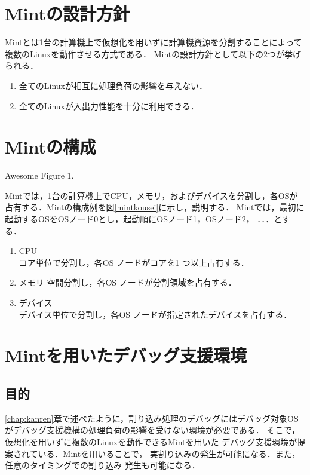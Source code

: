 \documentclass[tanilab-enum]{graduate}
\begin{document}
\section{Mintの設計方針}
Mintとは1台の計算機上で仮想化を用いずに計算機資源を分割することによって
複数のLinuxを動作させる方式である．
Mintの設計方針として以下の2つが挙げられる．
\begin{enumerate}
    \item 全てのLinuxが相互に処理負荷の影響を与えない．
    \item 全てのLinuxが入出力性能を十分に利用できる．
\end{enumerate}
\section{Mintの構成}
{Awesome Figure 1.}

Mintでは，1台の計算機上でCPU，メモリ，およびデバイスを分割し，各OSが
占有する．Mintの構成例を図\ref{mintkousei}に示し，説明する．
Mintでは，最初に起動するOSをOSノード0とし，起動順にOSノード1，OSノード2，
．．．とする．
\begin{enumerate}
    \item CPU\\
        コア単位で分割し，各OS ノードがコアを1 つ以上占有する．
    \item メモリ
        空間分割し，各OS ノードが分割領域を占有する．
    \item デバイス\\
        デバイス単位で分割し，各OS ノードが指定されたデバイスを占有する．
\end{enumerate}
\section{Mintを用いたデバッグ支援環境}
    \subsection{目的}
    \ref{chap:kanren}章で述べたように，割り込み処理のデバッグにはデバッグ対象OS
    がデバッグ支援機構の処理負荷の影響を受けない環境が必要である．
    そこで，仮想化を用いずに複数のLinuxを動作できるMintを用いた
    デバッグ支援環境が提案されている．Mintを用いることで，
    実割り込みの発生が可能になる．また，任意のタイミングでの割り込み
    発生も可能になる．
\end{document}
